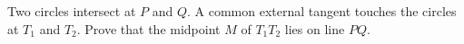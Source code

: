 Two circles intersect at $P$ and $Q$. A common external tangent touches the circles at $T_1$ and $T_2$. Prove that the midpoint $M$ of $T_1T_2$ lies on line $PQ$.
